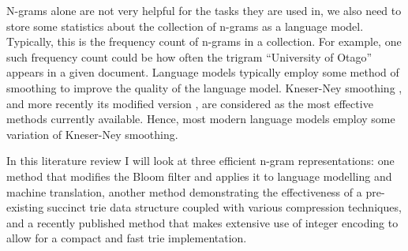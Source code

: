 \documentclass[sigconf, nonacm=true]{acmart}
\begin{document}
N-grams alone are not very helpful for the tasks they are used in, we also need to store some statistics about the collection of n-grams as a language model. Typically, this is the frequency count of n-grams in a collection. For example, one such frequency count could be how often the trigram ``University of Otago'' appears in a given document. Language models typically employ some method of smoothing to improve the quality of the language model. Kneser-Ney smoothing \cite{ney1994structuring}, and more recently its modified version \cite{chen1999empirical}, are considered as the most effective methods currently available. Hence, most modern language models employ some variation of Kneser-Ney smoothing.



In this literature review I will look at three efficient n-gram representations: one method that modifies the Bloom filter and applies it to language modelling and machine translation, another method demonstrating the effectiveness of a pre-existing succinct trie data structure coupled with various compression techniques, and a recently published method that makes extensive use of integer encoding to allow for a compact and fast trie implementation.
\end{document}
